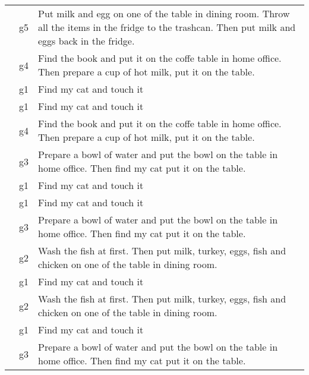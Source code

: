 \begin{table}[htbp]
\begin{tabular}{l|l|l}
 & g5 & Put milk and egg on one of the table in dining room. Throw all the items in the fridge to the trashcan. Then put milk and eggs back in the fridge. \\
 & g4 & Find the book and put it on the coffe table in home office. Then prepare a cup of hot milk, put it on the table. \\
 & g1 & Find my cat and touch it \\
 & g1 & Find my cat and touch it \\
 & g4 & Find the book and put it on the coffe table in home office. Then prepare a cup of hot milk, put it on the table. \\
 & g3 & Prepare a bowl of water and put the bowl on the table in home office. Then find my cat put it on the table. \\
 & g1 & Find my cat and touch it \\
 & g1 & Find my cat and touch it \\
 & g3 & Prepare a bowl of water and put the bowl on the table in home office. Then find my cat put it on the table. \\
 & g2 & Wash the fish at first. Then put milk, turkey, eggs, fish and chicken on one of the table in dining room. \\
 & g1 & Find my cat and touch it \\
 & g2 & Wash the fish at first. Then put milk, turkey, eggs, fish and chicken on one of the table in dining room. \\
 & g1 & Find my cat and touch it \\
 & g3 & Prepare a bowl of water and put the bowl on the table in home office. Then find my cat put it on the table. \\
\hline
\end{tabular}
\label{tab:task_goals}
\end{table}
